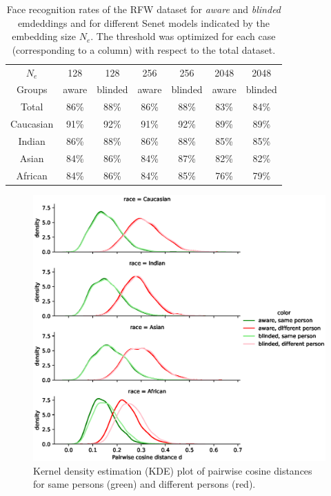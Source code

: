 \documentclass{report}
\begin{document}
\begin{table}
\begin{center}
\begin{tabular}{ c|c|c || c|c || c|c }
$N_e$ & 128 & 128 & 256 & 256 & 2048 & 2048 \\
Groups & aware  & blinded  & aware  & blinded  & aware  & blinded  \\
\hline
Total & 86\% & 88\%           &  86\% & 88\%    &  83\% & 84\%  \\ 
\hline
Caucasian & 91\% & 92\%    &  91\% & 92\%    &  89\% & 89\% \\  
Indian & 86\% & 88\%          &  86\% & 88\%    &  85\% & 85\%\\ 
Asian & 84\% & 86\%           &  84\% & 87\%    &  82\% & 82\%\\ 
African & 84\% &    86\%      &  84\% & 85\%    &  76\% & 79\% 
\end{tabular}
\end{center}
\caption{Face recognition rates of the RFW dataset for \emph{aware}  and  \emph{blinded} emdeddings and for different Senet models indicated by the embedding size $N_e$. The threshold was optimized for each case (corresponding to a column) with respect to the total dataset.}
\label{tab:frrate}
\end{table}

\begin{figure}
  \includegraphics[width=\textwidth]{bias.eps}
  \caption{Kernel density estimation (KDE) plot of pairwise cosine distances for same persons (green) and different persons (red).}
  \label{fig:frrate}
\end{figure}
\end{document}
